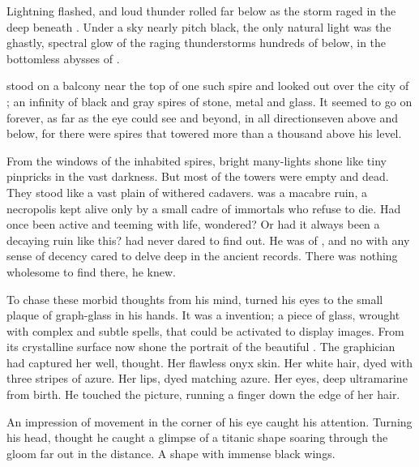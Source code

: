Lightning flashed, and loud thunder rolled far below as the storm raged in the deep beneath \Nyx. 
Under a sky nearly pitch black, the only natural light was the ghastly, spectral glow of the raging thunderstorms hundreds of \metres below, in the bottomless abysses of \Ullor. 

\Teshrial stood on a balcony near the top of one such spire and looked out over the city of \Nyx; an infinity of black and gray spires of stone, metal and glass.  
It seemed to go on forever, as far as the eye could see and beyond, in all directions\dash even above and below, for there were spires that towered more than a thousand \metres above his level. 

From the windows of the inhabited spires, bright many-\coloured lights shone like tiny pinpricks in the vast darkness. 
But most of the towers were empty and dead. 
They stood like a vast plain of withered cadavers. 
\Nyx was a macabre ruin, a necropolis kept alive only by a small cadre of immortals who refuse to die. 
Had \Nyx once been active and teeming with life, \Teshrial wondered?
Or had it always been a decaying ruin like this? 
\Teshrial had never dared to find out. 
He was of \CiriathSepher, and no \CiriathSepher with any sense of decency cared to delve deep in the ancient records.
There was nothing wholesome to find there, he knew. 

To chase these morbid thoughts from his mind, \Teshrial turned his eyes to the small plaque of graph-glass in his hands. 
It was a \resphan invention; a piece of glass, wrought with complex and subtle spells, that could be activated to display images. 
From its crystalline surface now shone the portrait of the beautiful \Firaxel. 
The graphician had captured her well, \Teshrial thought.  
Her flawless onyx skin. 
Her white hair, dyed with three stripes of azure. 
Her lips, dyed matching azure. 
Her eyes, deep ultramarine from birth. 
He touched the picture, running a finger down the edge of her hair.




An impression of movement in the corner of his eye caught his attention. 
Turning his head, \Teshrial thought he caught a glimpse of a titanic shape soaring through the gloom far out in the distance. 
A shape with immense black wings. 

